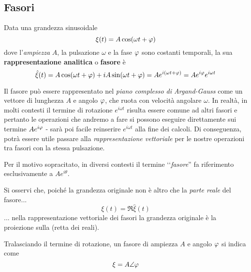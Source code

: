 \subsection{Fasori}\label{fasori}
\begin{define}[Fasore]
	Data una grandezza sinusoidale
	\begin{equation*}
		\xi(t)=A\cos(\omega t+\oldphi)
	\end{equation*}
	dove l'\textit{ampiezza} $A$, la pulsazione $\omega$ e la fase $\oldphi$ sono costanti temporali, la sua \textbf{rappresentazione analitica} o \textbf{fasore} è
	\begin{equation}
		\hat{\xi}(t)=A\cos(\omega t+\oldphi)+iA\sin(\omega t+\oldphi)=Ae^{i(\omega t+\oldphi)}=Ae^{i\oldphi}e^{i\omega t}
	\end{equation}
\end{define}
Il fasore può essere rappresentato nel \textit{piano complesso di Argand-Gauss} come un vettore di lunghezza $A$ e angolo $\oldphi$, che ruota con velocità angolare $\omega$.
In realtà, in molti contesti il termine di rotazione $e^{i\omega t}$ risulta essere comune ad altri fasori e pertanto le operazioni che andremo a fare si possono eseguire direttamente sui termine $Ae^{i\oldphi}$ - sarà poi facile reinserire $e^{i\omega t}$ alla fine dei calcoli. Di conseguenza, potrà essere utile passare alla \textit{rappresentazione vettoriale} per le nostre operazioni tra fasori con la stessa pulsazione.
\begin{attention}
	Per il motivo sopracitato, in diversi contesti il termine ‘‘\textit{fasore}'' fa riferimento esclusivamente a $Ae^{i\theta}$.
\end{attention}
Si osservi che, poiché la grandezza originale non è altro che la \textit{parte reale} del fasore...
\begin{equation}
	\xi(t)=\Re{\hat{\xi}(t)}
\end{equation}
... nella rappresentazione vettoriale dei fasori la grandezza originale è la proiezione sulla (retta dei reali).
\begin{notate}
	Tralasciando il termine di rotazione, un fasore di ampiezza $A$ e angolo $\oldphi$ si indica come
	\begin{equation}
		\xi=A\angle\oldphi
	\end{equation}
\end{notate}
